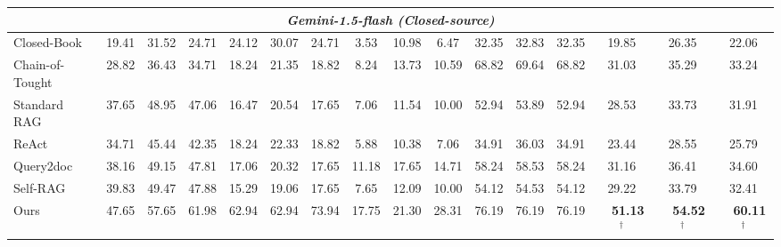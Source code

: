 \begin{table*}[t]
{\begin{tabular}{lccccccccccccccc}
\midrule
\multicolumn{16}{c}{\textit{Gemini-1.5-flash (Closed-source)}} \\
\midrule
Closed-Book & 19.41 & 31.52 & 24.71 & 24.12 & 30.07 & 24.71 & 3.53 & 10.98 & 6.47 & 32.35 & 32.83 & 32.35 & 19.85 & 26.35 & 22.06 \\
\multicolumn{1}{l}{Chain-of-Tought} & 28.82 & 36.43 & 34.71 & 18.24 & 21.35 & 18.82 & 8.24 & 13.73 & 10.59 & 68.82 & 69.64 & 68.82 & 31.03 & 35.29 & 33.24 \\
\multicolumn{1}{l}{Standard RAG} & 37.65 & 48.95 & 47.06 & 16.47 & 20.54 & 17.65 & 7.06 & 11.54 & 10.00 & 52.94 & 53.89 & 52.94 & 28.53 & 33.73 & 31.91 \\
\cmidrule(lr){2-16}
\multicolumn{1}{l}{ReAct} & 34.71 & 45.44 & 42.35 & 18.24 & 22.33 & 18.82 & 5.88 & 10.38 & 7.06 & 34.91 & 36.03 & 34.91 & 23.44 & 28.55 & 25.79 \\
\multicolumn{1}{l}{Query2doc} & 38.16 & 49.15 & 47.81 & 17.06 & 20.32 & 17.65 & 11.18 & 17.65 & 14.71 & 58.24 & 58.53 & 58.24 & 31.16 & 36.41 & 34.60\\
\multicolumn{1}{l}{Self-RAG} & 39.83 & 49.47 & 47.88 & 15.29 & 19.06 & 17.65 & 7.65 & 12.09 & 10.00 & 54.12 & 54.53 & 54.12 & 29.22 & 33.79 & 32.41 \\
\cmidrule(lr){2-16}
Ours & 47.65 & 57.65 & 61.98 & 62.94 & 62.94 & 73.94 & 17.75 & 21.30 & 28.31 & 76.19 & 76.19 & 76.19 & \ \ \textbf{51.13}$^{\dagger}$ & \ \ \textbf{54.52}$^{\dagger}$ & \ \ \textbf{60.11}$^{\dagger}$ \\
\midrule

\end{tabular}}
\end{table*}
